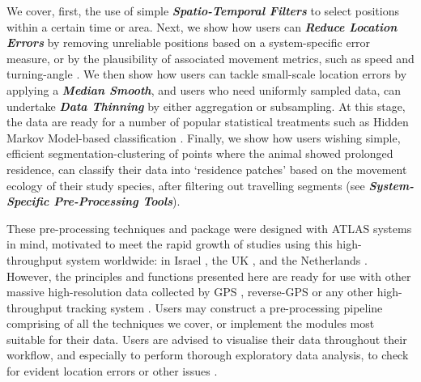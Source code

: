 \begin{refsection}
    We cover, first, the use of simple \textit{\textbf{Spatio-Temporal Filters}} to select positions within a certain time or area.
    Next, we show how users can \textit{\textbf{Reduce Location Errors}} by removing unreliable positions based on a system-specific error measure, or by the plausibility of associated movement metrics, such as speed and turning-angle \citep{seidel2018, calenge2009}.
    We then show how users can tackle small-scale location errors by applying a \textit{\textbf{Median Smooth}}, and users who need uniformly sampled data, can undertake \textit{\textbf{Data Thinning}} by either aggregation or subsampling.
    At this stage, the data are ready for a number of popular statistical treatments such as Hidden Markov Model-based classification \citep{michelot2016,langrock2012}.
    Finally, we show how users wishing simple, efficient segmentation-clustering of points where the animal showed prolonged residence, can classify their data into `residence patches' \citep{barraquand2008, bijleveld2016} based on the movement ecology of their study species, after filtering out travelling segments (see \textit{\textbf{System-Specific Pre-Processing Tools}}).

    These pre-processing techniques and package were designed with ATLAS systems in mind, motivated to meet the rapid growth of studies using this high-throughput system worldwide: in Israel \citep{toledo2014, toledo2016, toledo2020, corl2020, vilk2021}, the UK \citep{beardsworth2021a, beardsworth2021b}, and the Netherlands \citep[][Bijleveld et al. \textit{in prep.}]{beardsworth2021}. 
    However, the principles and functions presented here are ready for use with other massive high-resolution data collected by GPS \citep[e.g.][]{papageorgiou2019}, reverse-GPS \citep[e.g.][]{aspillaga2021} or any other high-throughput tracking system .
    Users may construct a pre-processing pipeline comprising of all the techniques we cover, or implement the modules most suitable for their data.
    Users are advised to visualise their data throughout their workflow, and especially to perform thorough exploratory data analysis, to check for evident location errors or other issues \citep{slingsby2016}.

        

\end{refsection}

